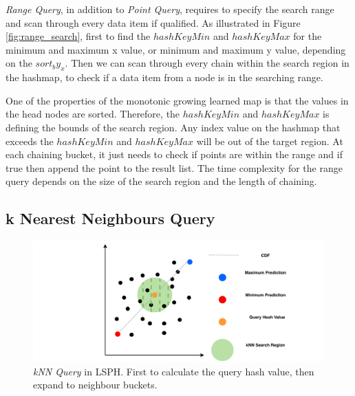\textit{Range Query}, in addition to \textit{Point Query}, requires to specify the search range and scan through every data item if qualified. As illustrated in Figure \ref{fig:range_search}, first to find the $hashKeyMin$ and $hashKeyMax$ for the minimum and maximum x value, or minimum and maximum y value, depending on the $sort_by_x$. Then we can scan through every chain within the search region in the hashmap, to check if a data item from a node is in the searching range.

One of the properties of the monotonic growing learned map is that the values in the head nodes are sorted. Therefore, the $hashKeyMin$ and $hashKeyMax$ is defining the bounds of the search region. Any index value on the hashmap that exceeds the $hashKeyMin$ and $hashKeyMax$ will be out of the target region. At each chaining bucket, it just needs to check if points are within the range and if true then append the point to the result list. The time complexity for the range query depends on the size of the search region and the length of chaining.  



\subsection{k Nearest Neighbours Query}

\begin{figure}[ht]
\centering
\includegraphics{Figures/knn.pdf}
\caption{\textit{kNN Query} in LSPH. First to calculate the query hash value, then expand to neighbour buckets.}
\label{fig:knn}
\end{figure}



